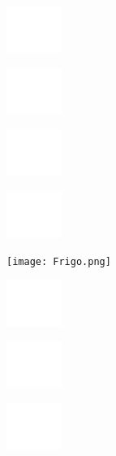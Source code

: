 \documentclass{article}
\begin{document}
\includegraphics[width=18mm]{Blank.jpg}
\par
\textbf{}
\vspace{1cm}

\includegraphics[width=18mm]{Blank.jpg}
\par
\textbf{}
\vspace{1cm}

\includegraphics[width=18mm]{Blank.jpg}
\par
\textbf{}
\vspace{1cm}

\includegraphics[width=18mm]{Blank.jpg}
\par
\textbf{}
\vspace{1cm}

\texttt{[image: Frigo.png]}
\par
\textbf{}
\vspace{1cm}

\includegraphics[width=18mm]{Blank.jpg}
\par
\textbf{}
\vspace{1cm}

\includegraphics[width=18mm]{Blank.jpg}
\par
\textbf{}
\vspace{1cm}

\includegraphics[width=18mm]{Blank.jpg}
\par
\textbf{}
\vspace{1cm}
\end{document}
